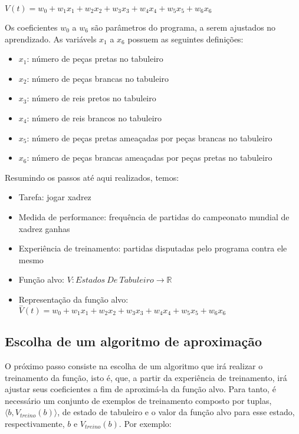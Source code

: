 $V(t) = w_0 + w_1 x_1 + w_2 x_2 + w_3 x_3 + w_4 x_4 + w_5 x_5 + w_6 x_6$

Os coeficientes $w_0$ a $w_6$ são parâmetros do programa, a serem ajustados no aprendizado. As variávels $x_1$ a $x_6$ possuem as seguintes definições:

\begin{itemize}
\item $x_1$: número de peças pretas no tabuleiro
\item $x_2$: número de peças brancas no tabuleiro
\item $x_3$: número de reis pretos no tabuleiro
\item $x_4$: número de reis brancos no tabuleiro
\item $x_5$: número de peças pretas ameaçadas por peças brancas no tabuleiro
\item $x_6$: número de peças brancas ameaçadas por peças pretas no tabuleiro
\end{itemize}

Resumindo os passos até aqui realizados, temos:

\begin{itemize}

\item Tarefa: jogar xadrez
\item Medida de performance: frequência de partidas do campeonato mundial de xadrez ganhas
\item Experiência de treinamento: partidas disputadas pelo programa contra ele mesmo
\item Função alvo: $V:Estados\ De\ Tabuleiro \rightarrow \mathbb{R}$
\item Representação da função alvo: $\overset{-}{V}(t) = w_0 + w_1 x_1 + w_2 x_2 + w_3 x_3 + w_4 x_4 + w_5 x_5 + w_6 x_6$

\end{itemize}

\subsection*{Escolha de um algoritmo de aproximação}

O próximo passo consiste na escolha de um algoritmo que irá realizar o treinamento da função, isto é, que, a partir da experiência de treinamento, irá ajustar seus coeficientes a fim de aproximá-la da função alvo. Para tanto, é necessário um conjunto de exemplos de treinamento composto por tuplas, $\langle b, V_{treino}(b) \rangle $, de estado de tabuleiro e o valor da função alvo para esse estado, respectivamente, $b$ e $V_{treino}(b)$. Por exemplo:

